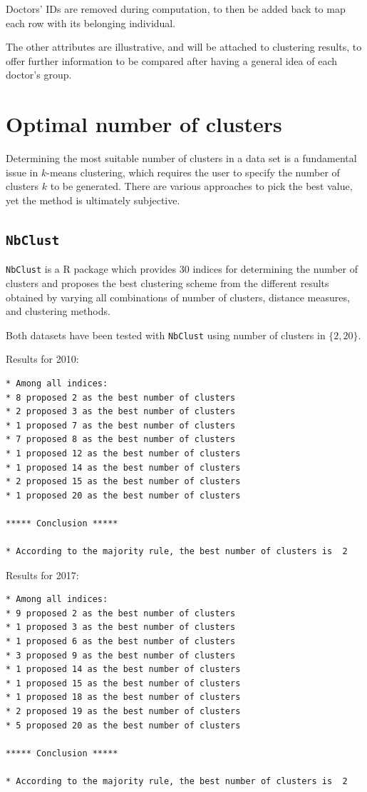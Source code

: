 Doctors' IDs are removed during computation, to then be added back to map each row with its belonging individual. 

The other attributes are illustrative, and will be attached to clustering results, to offer further information to be compared after having a general idea of each doctor's group. 

\section{Optimal number of clusters}
Determining the most suitable number of clusters in a data set is a fundamental issue in $k$-means clustering, which requires the user to specify the number of clusters $k$ to be generated. There are various approaches to pick the best value, yet the method is ultimately subjective\cite{silhouette}.

\subsection{\texttt{NbClust}}
\texttt{NbClust} is a R package which provides 30 indices for determining the number of clusters and proposes the best clustering scheme from the different results obtained by varying all combinations of number of clusters, distance measures, and clustering methods. 

Both datasets have been tested with \texttt{NbClust} using number of clusters in $\{2, 20\}$.

Results for 2010:
\begin{lstlisting}
* Among all indices:                                                
* 8 proposed 2 as the best number of clusters 
* 2 proposed 3 as the best number of clusters 
* 1 proposed 7 as the best number of clusters 
* 7 proposed 8 as the best number of clusters 
* 1 proposed 12 as the best number of clusters 
* 1 proposed 14 as the best number of clusters 
* 2 proposed 15 as the best number of clusters 
* 1 proposed 20 as the best number of clusters 

***** Conclusion *****                            

* According to the majority rule, the best number of clusters is  2 
\end{lstlisting}

Results for 2017:
\begin{lstlisting}
* Among all indices:                                                
* 9 proposed 2 as the best number of clusters 
* 1 proposed 3 as the best number of clusters 
* 1 proposed 6 as the best number of clusters 
* 3 proposed 9 as the best number of clusters 
* 1 proposed 14 as the best number of clusters 
* 1 proposed 15 as the best number of clusters 
* 1 proposed 18 as the best number of clusters 
* 2 proposed 19 as the best number of clusters 
* 5 proposed 20 as the best number of clusters 

***** Conclusion *****                            

* According to the majority rule, the best number of clusters is  2 
\end{lstlisting}

